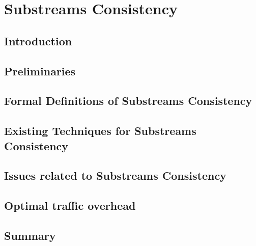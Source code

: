 \chapter{Substreams Consistency}
\label{thesis-chapter-substreams-consistency}

\section{Introduction}

\section{Preliminaries}

\section{Formal Definitions of Substreams Consistency}

\section{Existing Techniques for Substreams Consistency}

\section{Issues related to Substreams Consistency}

\section{Optimal traffic overhead}

\section{Summary}